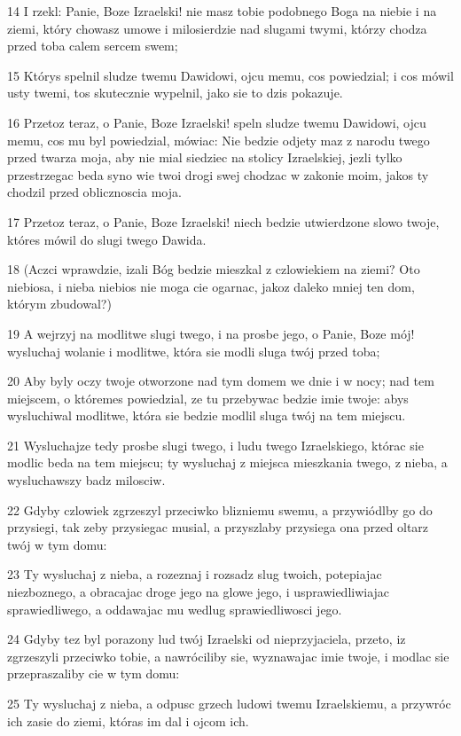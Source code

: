 \par 14 I rzekl: Panie, Boze Izraelski! nie masz tobie podobnego Boga na niebie i na ziemi, który chowasz umowe i milosierdzie nad slugami twymi, którzy chodza przed toba calem sercem swem;
\par 15 Którys spelnil sludze twemu Dawidowi, ojcu memu, cos powiedzial; i cos mówil usty twemi, tos skutecznie wypelnil, jako sie to dzis pokazuje.
\par 16 Przetoz teraz, o Panie, Boze Izraelski! speln sludze twemu Dawidowi, ojcu memu, cos mu byl powiedzial, mówiac: Nie bedzie odjety maz z narodu twego przed twarza moja, aby nie mial siedziec na stolicy Izraelskiej, jezli tylko przestrzegac beda syno wie twoi drogi swej chodzac w zakonie moim, jakos ty chodzil przed oblicznoscia moja.
\par 17 Przetoz teraz, o Panie, Boze Izraelski! niech bedzie utwierdzone slowo twoje, któres mówil do slugi twego Dawida.
\par 18 (Aczci wprawdzie, izali Bóg bedzie mieszkal z czlowiekiem na ziemi? Oto niebiosa, i nieba niebios nie moga cie ogarnac, jakoz daleko mniej ten dom, którym zbudowal?)
\par 19 A wejrzyj na modlitwe slugi twego, i na prosbe jego, o Panie, Boze mój! wysluchaj wolanie i modlitwe, która sie modli sluga twój przed toba;
\par 20 Aby byly oczy twoje otworzone nad tym domem we dnie i w nocy; nad tem miejscem, o któremes powiedzial, ze tu przebywac bedzie imie twoje: abys wysluchiwal modlitwe, która sie bedzie modlil sluga twój na tem miejscu.
\par 21 Wysluchajze tedy prosbe slugi twego, i ludu twego Izraelskiego, którac sie modlic beda na tem miejscu; ty wysluchaj z miejsca mieszkania twego, z nieba, a wysluchawszy badz milosciw.
\par 22 Gdyby czlowiek zgrzeszyl przeciwko blizniemu swemu, a przywiódlby go do przysiegi, tak zeby przysiegac musial, a przyszlaby przysiega ona przed oltarz twój w tym domu:
\par 23 Ty wysluchaj z nieba, a rozeznaj i rozsadz slug twoich, potepiajac niezboznego, a obracajac droge jego na glowe jego, i usprawiedliwiajac sprawiedliwego, a oddawajac mu wedlug sprawiedliwosci jego.
\par 24 Gdyby tez byl porazony lud twój Izraelski od nieprzyjaciela, przeto, iz zgrzeszyli przeciwko tobie, a nawróciliby sie, wyznawajac imie twoje, i modlac sie przepraszaliby cie w tym domu:
\par 25 Ty wysluchaj z nieba, a odpusc grzech ludowi twemu Izraelskiemu, a przywróc ich zasie do ziemi, któras im dal i ojcom ich.
